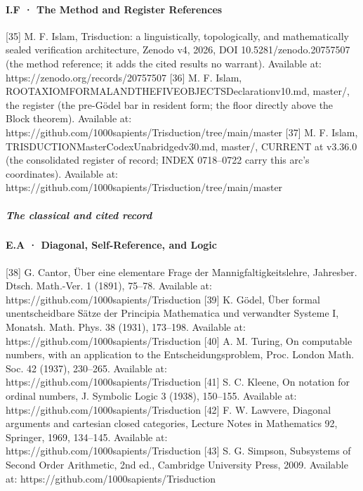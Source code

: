 \documentclass[10pt]{article}
\renewcommand{\_}{\origunderscore\allowbreak}
\begin{document}
\hypertarget{i.f-the-method-and-register-references}{%
\paragraph{I.F · The Method and Register
References}\label{i.f-the-method-and-register-references}}

{[}35{]} M. F. Islam, Trisduction: a linguistically, topologically, and
mathematically sealed verification architecture, Zenodo v4, 2026, DOI
10.5281/zenodo.20757507 (the method reference; it adds the cited results
no warrant). Available at: https://zenodo.org/records/20757507 {[}36{]}
M. F. Islam,
ROOT\_AXIOM\_FORMAL\_AND\_THE\_FIVE\_OBJECTS\_Declaration\_v1\_1\_0.md,
master/, the register (the pre-Gödel bar in resident form; the floor
directly above the Block theorem). Available at:
https://github.com/1000sapients/Trisduction/tree/main/master {[}37{]} M.
F. Islam, TRISDUCTION\_Master\_Codex\_Unabridged\_v3\_36\_0.md, master/,
CURRENT at v3.36.0 (the consolidated register of record; INDEX
0718--0722 carry this arc's coordinates). Available at:
https://github.com/1000sapients/Trisduction/tree/main/master

\hypertarget{the-classical-and-cited-record}{%
\subparagraph{The classical and cited
record}\label{the-classical-and-cited-record}}

\hypertarget{e.a-diagonal-self-reference-and-logic}{%
\paragraph{E.A · Diagonal, Self-Reference, and
Logic}\label{e.a-diagonal-self-reference-and-logic}}

{[}38{]} G. Cantor, Über eine elementare Frage der
Mannigfaltigkeitslehre, Jahresber. Dtsch. Math.-Ver. 1 (1891), 75--78.
Available at: https://github.com/1000sapients/Trisduction {[}39{]} K.
Gödel, Über formal unentscheidbare Sätze der Principia Mathematica und
verwandter Systeme I, Monatsh. Math. Phys. 38 (1931), 173--198.
Available at: https://github.com/1000sapients/Trisduction {[}40{]} A. M.
Turing, On computable numbers, with an application to the
Entscheidungsproblem, Proc. London Math. Soc. 42 (1937), 230--265.
Available at: https://github.com/1000sapients/Trisduction {[}41{]} S. C.
Kleene, On notation for ordinal numbers, J. Symbolic Logic 3 (1938),
150--155. Available at: https://github.com/1000sapients/Trisduction
{[}42{]} F. W. Lawvere, Diagonal arguments and cartesian closed
categories, Lecture Notes in Mathematics 92, Springer, 1969, 134--145.
Available at: https://github.com/1000sapients/Trisduction {[}43{]} S. G.
Simpson, Subsystems of Second Order Arithmetic, 2nd ed., Cambridge
University Press, 2009. Available at:
https://github.com/1000sapients/Trisduction
\end{document}
